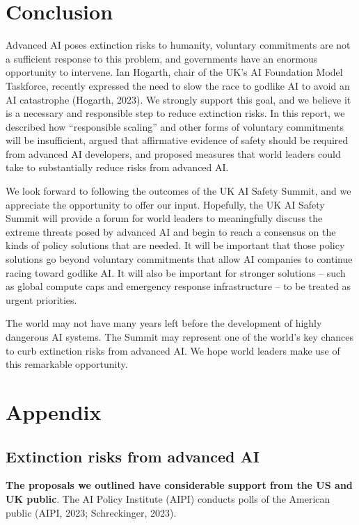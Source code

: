 \documentclass[12pt,a4paper]{article}
\begin{document}
\newpage
\newpage
\section{Conclusion}
Advanced AI poses extinction risks to humanity, voluntary commitments are not a sufficient response to this problem, and governments have an enormous opportunity to intervene. Ian Hogarth, chair of the UK’s AI Foundation Model Taskforce, recently expressed the need to slow the race to godlike AI to avoid an AI catastrophe (Hogarth, 2023). We strongly support this goal, and we believe it is a necessary and responsible step to reduce extinction risks. In this report, we described how “responsible scaling” and other forms of voluntary commitments will be insufficient, argued that affirmative evidence of safety should be required from advanced AI developers, and proposed measures that world leaders could take to substantially reduce risks from advanced AI. 

We look forward to following the outcomes of the UK AI Safety Summit, and we appreciate the opportunity to offer our input. Hopefully, the UK AI Safety Summit will provide a forum for world leaders to meaningfully discuss the extreme threats posed by advanced AI and begin to reach a consensus on the kinds of policy solutions that are needed. It will be important that those policy solutions go beyond voluntary commitments that allow AI companies to continue racing toward godlike AI. It will also be important for stronger solutions – such as global compute caps and emergency response infrastructure – to be treated as urgent priorities. 

The world may not have many years left before the development of highly dangerous AI systems. The Summit may represent one of the world’s key chances to curb extinction risks from advanced AI. We hope world leaders make use of this remarkable opportunity. 

\newpage
\section*{Appendix}\label{sec:intro}
\subsection*{Extinction risks from advanced AI} 
\textbf{The proposals we outlined have considerable support from the US and UK public}. The AI Policy Institute (AIPI) conducts polls of the American public (AIPI, 2023; Schreckinger, 2023). 
\end{document}
